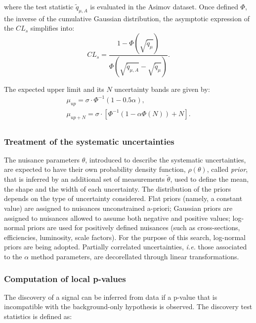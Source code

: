 \noindent where the test statistic $\tilde{q}_{\mu, A}$ is evaluated in the Asimov dataset. Once defined $\Phi$, the inverse of the cumulative Gaussian distribution, the asymptotic expression of the $CL_s$ simplifies into:
\begin{equation}
CL_s = \frac{1 - \Phi \left( \sqrt{\tilde{q}_{\mu}} \right)}{ \Phi \left( \sqrt{\tilde{q}_{\mu, A}} - \sqrt{\tilde{q}_{\mu}} \right) }.
\end{equation}

\noindent The expected upper limit and its $N$ uncertainty bands are given by:
\begin{equation}
\begin{gathered}
\mu_{up} = \sigma \cdot \Phi^{-1} \left( 1 - 0.5 \alpha \right),\\
\mu_{up + N} = \sigma \cdot \left[ \Phi^{-1}  \left( 1 - \alpha \Phi(N)  \right) + N \right].\\
\end{gathered}
\end{equation}

\subsubsection{Treatment of the systematic uncertainties}
The nuisance parameters $\theta$, introduced to describe the systematic uncertainties, are expected to have their own probability density function, $\rho (\theta)$, called \emph{prior}, that is inferred by an additional set of measurements $\tilde{\theta}$, used to define the mean, the shape and the width of each uncertainty. The distribution of the priors depends on the type of uncertainty considered. Flat priors (namely, a constant value) are assigned to nuisances unconstrained a-priori; Gaussian priors are assigned to nuisances allowed to assume both negative and positive values; log-normal priors are used for positively defined nuisances (such as cross-sections, efficiencies, luminosity, scale factors). For the purpose of this search, log-normal priors are being adopted. Partially correlated uncertainties, \textit{i.e.} those associated to the $\alpha$ method parameters, are decorellated through linear transformations.

\subsubsection{Computation of local p-values}
The discovery of a signal can be inferred from data if a p-value that is incompatible with the background-only hypothesis is observed. The discovery test statistics is defined as:

